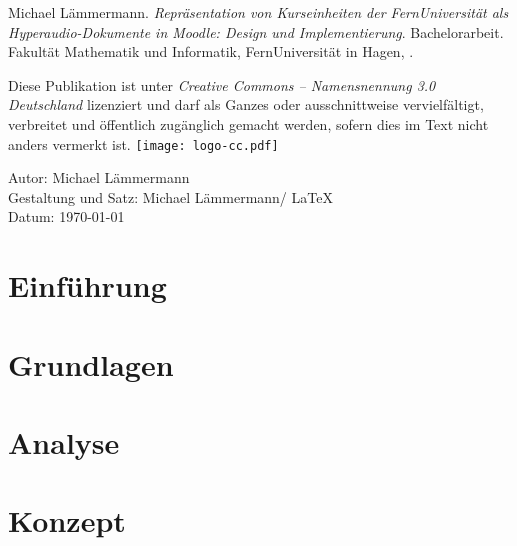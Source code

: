 \documentclass[twoside,bibliography=totoc,openany]{fumi}
\newcommand{\thesistitle}{Repräsentation von Kurseinheiten der FernUniversität als Hyperaudio-Dokumente in Moodle: Design und Implementierung}
\newcommand{\thesisauthor}{Michael Lämmermann}
\newcommand{\thesistype}{Bachelorarbeit} %
\begin{document}
{\small

\thesisauthor. \textit{\thesistitle}. \thesistype. Fakultät Mathematik und Informatik, FernUniversität in Hagen, \the\year. %
\\\vfill

Diese Publikation ist unter \emph{Creative Commons -- Namensnennung 3.0 Deutschland} lizenziert und darf als Ganzes oder ausschnittweise vervielfältigt, verbreitet und öffentlich zugänglich gemacht werden, sofern dies im Text nicht anders vermerkt ist.\newline\vspace{10pt}
\hspace{-9pt}\texttt{[image: logo-cc.pdf]}
\\\vspace{10pt}

Autor: \thesisauthor\\
Gestaltung und Satz: \thesisauthor / \LaTeX\\
Datum: \today\\
\cleardoublepage
}

\pagestyle{headings}
\tableofcontents


\chapter{Einführung}



\chapter{Grundlagen}



\chapter{Analyse}



\chapter{Konzept}

\end{document}
